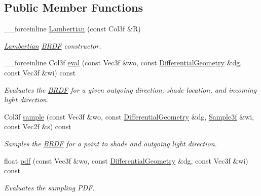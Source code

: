 \subsection*{Public Member Functions}
\begin{DoxyCompactItemize}
\item 
\_\-\_\-forceinline \hyperlink{classembree_1_1_lambertian_a0e75695e3fa67d1c83599631e6fb1d22}{Lambertian} (const Col3f \&R)
\begin{DoxyCompactList}\small\item\em \hyperlink{classembree_1_1_lambertian}{Lambertian} \hyperlink{classembree_1_1_b_r_d_f}{BRDF} constructor. \item\end{DoxyCompactList}\item 
\_\-\_\-forceinline Col3f \hyperlink{classembree_1_1_lambertian_a623a323d9862e008c9cc54e19ba28aba}{eval} (const Vec3f \&wo, const \hyperlink{structembree_1_1_differential_geometry}{DifferentialGeometry} \&dg, const Vec3f \&wi) const 
\begin{DoxyCompactList}\small\item\em Evaluates the \hyperlink{classembree_1_1_b_r_d_f}{BRDF} for a given outgoing direction, shade location, and incoming light direction. \item\end{DoxyCompactList}\item 
Col3f \hyperlink{classembree_1_1_lambertian_a99125affac6254680b17fd210f007259}{sample} (const Vec3f \&wo, const \hyperlink{structembree_1_1_differential_geometry}{DifferentialGeometry} \&dg, \hyperlink{structembree_1_1_sample}{Sample3f} \&wi, const Vec2f \&s) const 
\begin{DoxyCompactList}\small\item\em Samples the \hyperlink{classembree_1_1_b_r_d_f}{BRDF} for a point to shade and outgoing light direction. \item\end{DoxyCompactList}\item 
float \hyperlink{classembree_1_1_lambertian_a972b1098b59118ae1ed2e9f42bbbc747}{pdf} (const Vec3f \&wo, const \hyperlink{structembree_1_1_differential_geometry}{DifferentialGeometry} \&dg, const Vec3f \&wi) const 
\begin{DoxyCompactList}\small\item\em Evaluates the sampling PDF. \item\end{DoxyCompactList}\end{DoxyCompactItemize}


